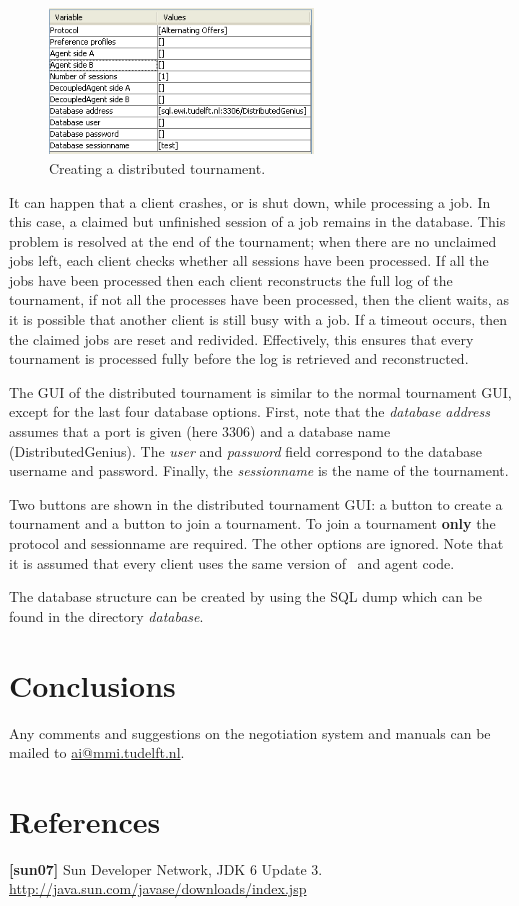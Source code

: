 \documentclass[]{article}
\begin{document}
\begin{figure}[h!] 
	\center
	\includegraphics[width=7cm]{media/Decoupled_DTsettings.png}
	\caption{Creating a distributed tournament.}
	\label{fig:dtsettings}
\end{figure}

It can happen that a client crashes, or is shut down, while processing a job. In this case, a claimed but unfinished session of a job remains in the database. This problem is resolved at the end of the tournament; when there are no unclaimed jobs left, each client checks whether all sessions have been processed.  If all the jobs have been processed then each client reconstructs the full log of the tournament, if not all the processes have been processed, then the client waits, as it is possible that another client is still busy with a job. If a timeout occurs, then the claimed jobs are reset and redivided. Effectively, this ensures that every tournament is processed fully before the log is retrieved and reconstructed.

The GUI of the distributed tournament is similar to the normal tournament GUI, except for the last four database options. First, note that the \textit{database address} assumes that a port is given (here 3306) and a database name (DistributedGenius). The \textit{user} and \textit{password} field correspond to the database username and password. Finally, the \textit{sessionname} is the name of the tournament.

Two buttons are shown in the distributed tournament GUI: a button to create a tournament and a button to join a tournament. To join a tournament \textbf{only} the protocol and sessionname are required. The other options are ignored. Note that it is assumed that every client uses the same version of \Genius~and agent code.

The database structure can be created by using the SQL dump which can be found in the directory \textit{database}. 

\section{Conclusions}
Any comments and suggestions on the negotiation system and manuals can be mailed to \url{ai@mmi.tudelft.nl}.

\section{References}
\textbf{[sun07]} Sun Developer Network, JDK 6 Update 3. \url{http://java.sun.com/javase/downloads/index.jsp}

%
%
\end{document}
